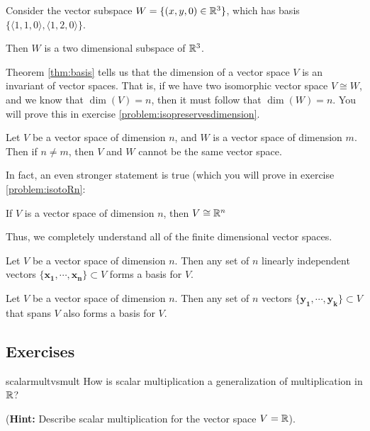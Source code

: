     \begin{example}
    Consider the vector subspace $W = \{(x, y, 0) \in \mathbb{R}^3 \}$, which has basis $\{\langle1,1,0\rangle,\langle1,2,0\rangle\}$.
    
    Then $W$ is a two dimensional subspace of $\mathbb{R}^3$.
    \end{example}
    
    
    Theorem \ref{thm:basis} tells us that the dimension of a vector space $V$ is an invariant of vector spaces. That is, if we have two isomorphic vector space $V \cong W$, and we know that $\dim(V) = n$, then it must follow that $\dim(W) = n$.  You will prove this in exercise \ref{problem:isopreservesdimension}.
    
    \begin{corollary}
    Let $V$ be a vector space of dimension $n$, and $W$ is a vector space of dimension $m$.   Then if $n \neq m$, then $V$ and $W$ cannot be the same vector space.
    \end{corollary}
    
    In fact, an even stronger statement is true (which you will prove in exercise \ref{problem:isotoRn}:
    
    \begin{theorem}
        If $V$ is a vector space of dimension $n$, then $V \cong \mathbb{R}^n$
    \end{theorem}
    
    Thus, we completely understand all of the finite dimensional vector spaces.
    
    
    \begin{proposition}
    Let $V$ be a vector space of dimension $n$.  Then any set of $n$ linearly independent vectors $\{\bm{x_1}, \cdots, \bm{x_n}\} \subset V$ forms a basis for $V$.
    \end{proposition}
    
    \begin{proposition}
    Let $V$ be a vector space of dimension $n$.  Then any set of $n$ vectors $\{\bm{y_1}, \cdots, \bm{y_k}\} \subset V$ that spans $V$ also forms a basis for $V$.
    \end{proposition}
    
\subsection{Exercises}
    
    
    \begin{problem}{scalarmultvsmult}
    How is scalar multiplication a generalization of multiplication in $\mathbb{R}$?  

    (\textbf{Hint:} Describe scalar multiplication for the vector space $V = \mathbb{R}$).
\end{problem}
    
